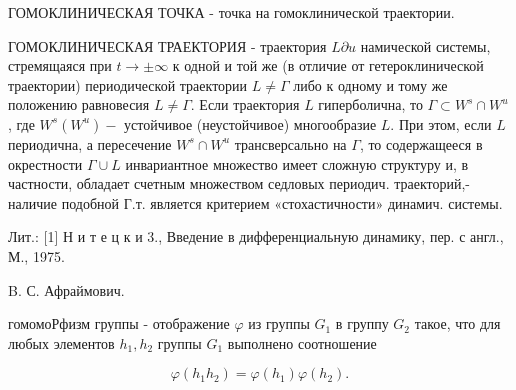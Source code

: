 \documentclass[10pt]{article}
\begin{document}
ГОМОКЛИНИЧЕСКАЯ ТОЧКА - точка на гомоклинической траектории.



ГОМОКЛИНИЧЕСКАЯ ТРАЕКТОРИЯ - траектория $L \partial u$ намической системы, стремящаяся при $t \rightarrow \pm \infty$ к одной и той же (в отличие от гетероклинической траектории) периодической траектории $L \neq \Gamma$ либо к одному и тому же положению равновесия $L \neq \Gamma$. Если траектория $L$ гиперболична, то $\Gamma \subset W^{s} \cap W^{u}$, где $W^{s}\left(W^{u}\right)-$ устойчивое (неустойчивое) многообразие $L$. При этом, если $L$ периодична, а пересечение $W^{s} \cap W^{u}$ трансверсально на $\Gamma$, то содержащееся в окрестности $\Gamma \cup L$ инвариантное множество имеет сложную структуру и, в частности, обладает счетным множеством седловых периодич. траекторий,- наличие подобной Г.т. является критерием «стохастичности» динамич. системы.



Лит.: [1] Н и т е ц к и 3., Введение в дифференциальную динамику, пер. с англ., М., 1975.



B. С. Афраймович.



гомомоРфизм группы - отображение $\varphi$ из группы $G_{1}$ в группу $G_{2}$ такое, что для любых элементов $h_{1}, h_{2}$ группы $G_{1}$ выполнено соотношение



\[

\varphi\left(h_{1} h_{2}\right)=\varphi\left(h_{1}\right) \varphi\left(h_{2}\right) .

\]
\end{document}
